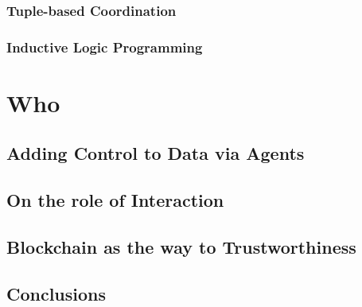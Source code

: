 \documentclass[12pt,a4paper,openright,twoside]{book}
\begin{document}
\section{Tuple-based Coordination}


\section{Inductive Logic Programming}


\part{Who}
\label{part:who}

\cite{imagination-extraamas2021}
\cite{expectation-extraamas2021}

\chapter{Adding Control to Data via Agents}

\chapter{On the role of Interaction}

\cite{tusow-icccn2019}
\cite{respect-idc2017}
\cite{respectx-comsis15}

\chapter{Blockchain as the way to Trustworthiness}

\cite{bctcoord-bct4mas2018wi}
\cite{bctcoord-bct4mas2019}
\cite{bctcoordination-information11}
\cite{blockchain-goodtechs2018}
\cite{proactivesc-blockchain2019}
\cite{blockchainmas-applsci10}


\finalpart{}

\chapter{Conclusions}


\backmatter




\end{document}
